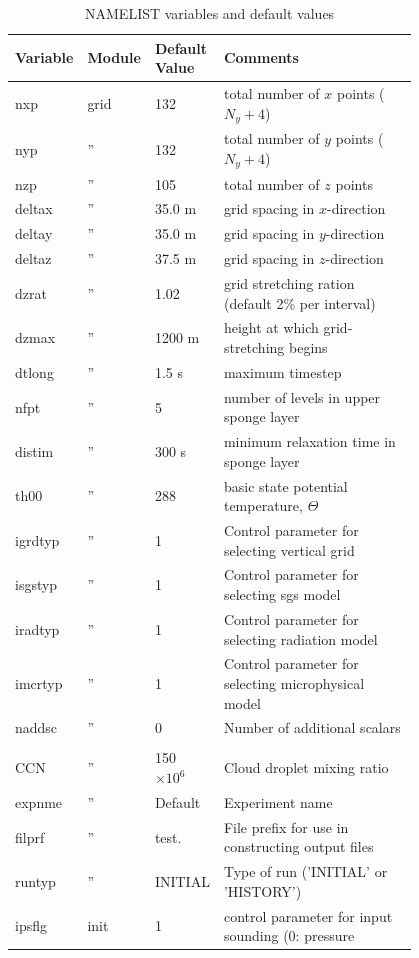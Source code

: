 \documentclass[11pt,a4paper]{article}
\begin{document}
\begin{longtable}[htb]{p{0.1\linewidth}p{0.1\linewidth}p{0.1\linewidth}p{0.5\linewidth}}
\caption{NAMELIST variables and default values} \label{tbl:namelist}
\\ \hline \hline 
Variable & Module & Default Value & Comments \\ \hline \endhead
nxp & grid & 132 & total number of $x$ points ($N_y+4$) \\
nyp &  '' & 132 & total number of $y$ points ($N_y+4$) \\
nzp &  '' & 105 & total number of $z$ points \\
deltax & '' & 35.0 m & grid spacing in $x$-direction \\
deltay & '' & 35.0 m & grid spacing in $y$-direction \\
deltaz & '' & 37.5 m & grid spacing in $z$-direction \\
dzrat  & '' & 1.02   & grid stretching ration (default 2\% per
interval) \\
dzmax  & '' & 1200 m & height at which grid-stretching begins \\
dtlong & '' & 1.5 s  & maximum timestep \\
nfpt   & '' & 5      & number of levels in upper sponge layer \\
distim & '' & 300 s  & minimum relaxation time in sponge layer \\
th00   & '' & 288    & basic state potential temperature, $\Theta$ \\
igrdtyp & '' & 1 & Control parameter for selecting vertical grid \\
isgstyp & '' & 1 & Control parameter for selecting sgs model \\
iradtyp & '' & 1 & Control parameter for selecting radiation model \\
imcrtyp & '' & 1 & Control parameter for selecting microphysical model \\
naddsc  & '' & 0 &  Number of additional scalars \\
\\
CCN     & '' & 150 $\times 10^{6}$ & Cloud droplet mixing ratio \\
expnme  & '' & Default & Experiment name \\
filprf  & '' & test. & File prefix for use in constructing output files
\\ 
runtyp& ''   & INITIAL & Type of run ('INITIAL' or 'HISTORY') \\ \hline
ipsflg&  init  & 1   & control parameter for input sounding (0: pressure

\end{longtable}
\end{document}
